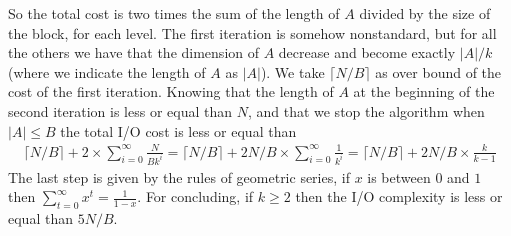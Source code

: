 \documentclass[a4paper]{article}
\newcommand\ceil[1]{\lceil#1\rceil}
\begin{document}
So the total cost is two times the sum of the length of $A$ divided by the size of the block, for each level.
The first iteration is somehow nonstandard, but for all the others we have that the dimension of $A$ decrease and become exactly $|A|/k$ (where we indicate the length of $A$ as $|A|$).
We take $\ceil{N/B}$ as over bound of the cost of the first iteration.
Knowing that the length of $A$ at the beginning of the second iteration is less or equal than $N$, and that we stop the algorithm when $|A| \leq B$ the total I/O cost is less or equal than
\begin{align*}
\ceil{N/B} + 2 \times \sum_{i = 0}^{\infty} \frac{N}{Bk^i} = \ceil{N/B} + 2N/B \times \sum_{i = 0}^{\infty} \frac{1}{k^i} = \ceil{N/B} + 2N/B \times \frac{k}{k - 1}
\end{align*}
The last step is given by the rules of geometric series, if $x$ is between $0$ and $1$ then $\sum_{t = 0}^{\infty} x^t = \frac{1}{1 - x}$.
For concluding, if $k \geq 2$ then the I/O complexity is less or equal than $5N/B$.
\end{document}
